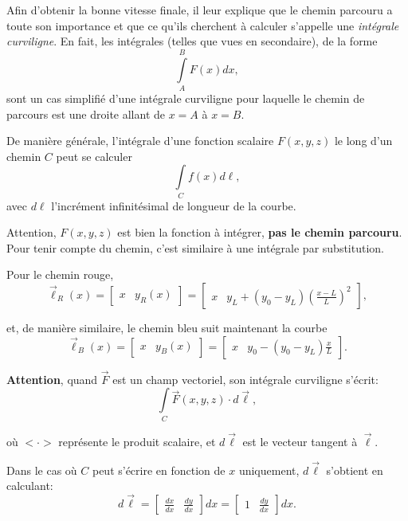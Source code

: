 \documentclass{cup-pan}
\begin{document}
Afin d'obtenir la bonne vitesse finale, il leur explique que le chemin parcouru a toute son importance et que ce qu'ils cherchent à calculer s'appelle une \emph{intégrale curviligne}. En fait, les intégrales (telles que vues en secondaire), de la forme
\begin{equation}
    \int\limits_A^B F(x) dx,
\end{equation}
sont un cas simplifié d'une intégrale curviligne pour laquelle le chemin de parcours est une droite allant de $x=A$ à $x=B$.

De manière générale, l'intégrale d'une fonction scalaire $F(x, y, z)$ le long d'un chemin $C$ peut se calculer
\begin{equation}\label{eq:int_scal}
    \int\limits_C f(x) d\ell,
\end{equation}
avec $d\ell$ l'incrément infinitésimal de longueur de la courbe. 

Attention, $F(x,y,z)$ est bien la fonction à intégrer, \textbf{pas le chemin parcouru}. Pour tenir compte du chemin, c'est similaire à une intégrale par substitution.

Pour le chemin rouge, 
\begin{equation}
    \vec{\ell}_R(x) = \begin{bmatrix}x & y_R(x)\end{bmatrix} =
\begin{bmatrix}x & y_L + (y_0 - y_L)\left(\frac{x-L}{L}\right)^2\end{bmatrix},
\end{equation}

et, de manière similaire, le chemin bleu suit maintenant la courbe
\begin{equation}
    \vec{\ell}_B(x) = \begin{bmatrix}x & y_B(x)\end{bmatrix} = \begin{bmatrix}x & y_0 - (y_0 - y_L)\frac{x}{L}\end{bmatrix}.
\end{equation}

\textbf{Attention}, quand $\vec{F}$ est un champ vectoriel, son intégrale curviligne s'écrit:
\begin{equation}\label{eq:int_vec}
    \int\limits_C \vec{F}(x,y,z) \cdot d\vec{\ell},
\end{equation}

où $<\cdot>$ représente le produit scalaire, et $d\vec{\ell}$ est le vecteur tangent à $\vec{\ell}$.

Dans le cas où $C$ peut s'écrire en fonction de $x$ uniquement, $d\vec{\ell}$ s'obtient en calculant:
\begin{equation}
    d\vec{\ell} = \begin{bmatrix}\frac{dx}{dx} & \frac{dy}{dx}\end{bmatrix} dx = \begin{bmatrix} 1 & \frac{dy}{dx}\end{bmatrix} dx.
\end{equation}
\end{document}
